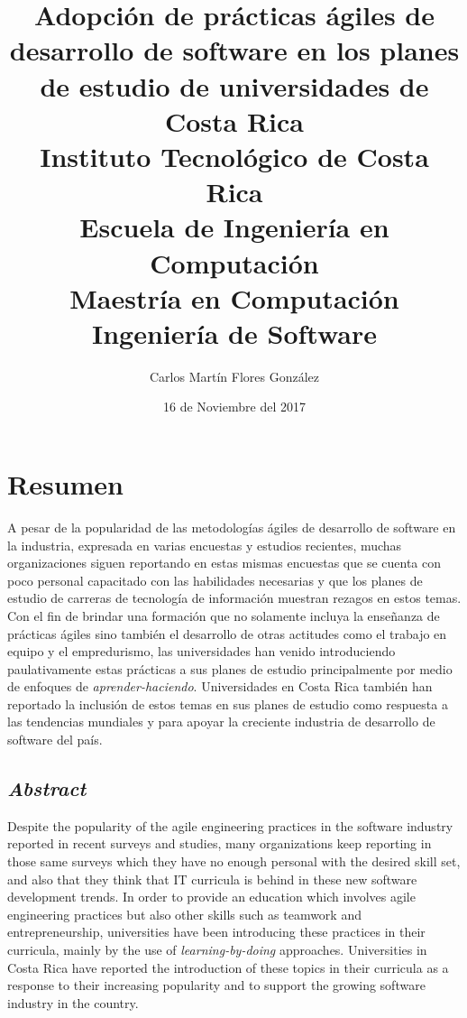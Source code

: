 \documentclass[12pt, twoside]{report}
\title{Adopción de prácticas ágiles de desarrollo de software en los planes de estudio de universidades de Costa Rica\\
	{\large Instituto Tecnológico de Costa Rica\\
	Escuela de Ingeniería en Computación\\
	Maestría en Computación\\
	Ingeniería de Software
	}
}
\author{Carlos Martín Flores González}
\date{16 de Noviembre del 2017}
\begin{document}
  
 
\maketitle




\setcounter{page}{1}
\tableofcontents
\clearpage

%
\listoftables
\cleardoublepage







\printglossaries





\chapter*{Resumen}
A pesar de la popularidad de las metodologías ágiles de desarrollo de software en la industria, expresada en varias encuestas y estudios recientes, muchas organizaciones siguen reportando en estas mismas encuestas que se cuenta con poco personal capacitado con las habilidades necesarias y que los planes de estudio de carreras de tecnología de información muestran rezagos en estos temas. Con el fin de brindar una formación que no solamente incluya la enseñanza de prácticas ágiles sino también el desarrollo de otras actitudes como el trabajo en equipo y el empredurismo, las universidades han venido introduciendo paulativamente estas prácticas a sus planes de estudio principalmente por medio de enfoques de \emph{aprender-haciendo}. Universidades en Costa Rica también han reportado la inclusión de estos temas en sus planes de estudio como respuesta a las tendencias mundiales y para apoyar la creciente industria de desarrollo de software del país.


\section*{\emph{Abstract}}
Despite the popularity of the agile engineering practices in the software industry reported in recent surveys and studies, many organizations keep reporting in those same surveys which they have no enough personal with the desired skill set, and also that they think that IT curricula is behind in these new software development trends. In order to provide an education which involves agile engineering practices but also other skills such as teamwork and entrepreneurship, universities have been introducing these practices in their curricula, mainly by the use of \emph{learning-by-doing} approaches. Universities in Costa Rica have reported the introduction of these topics in their curricula as a response to their increasing popularity and to support the growing software industry in the country.  
\end{document}
